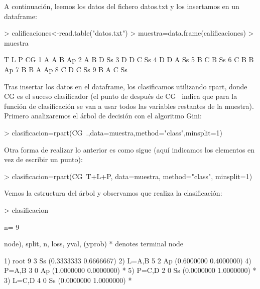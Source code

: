 \documentclass [a4paper] {article}
\begin{document}
A continuación, leemos los datos del fichero datos.txt y los insertamos en un dataframe:

\begin{Schunk}
\begin{Sinput}
> calificaciones<-read.table("datos.txt")
> muestra=data.frame(calificaciones)
> muestra
\end{Sinput}
\begin{Soutput}
  T L P CG
1 A A B Ap
2 A B D Ss
3 D D C Ss
4 D D A Ss
5 B C B Ss
6 C B B Ap
7 B B A Ap
8 C D C Ss
9 B A C Ss
\end{Soutput}
\end{Schunk}

Tras insertar los datos en el dataframe, los clasificamos utilizando rpart, donde CG es el suceso
clasificador (el punto de después de CG~ indica que para la función de clasificación se van a usar todos
las variables restantes de la muestra). Primero analizaremos el árbol de decisión con el algoritmo Gini:


\begin{Schunk}
\begin{Sinput}
> clasificacion=rpart(CG~.,data=muestra,method="class",minsplit=1)
\end{Sinput}
\end{Schunk}


Otra forma de realizar lo anterior es como sigue (aquí indicamos los elementos en vez de escribir un punto):

\begin{Schunk}
\begin{Sinput}
> clasificacion=rpart(CG~T+L+P, data=muestra, method="class", minsplit=1)
\end{Sinput}
\end{Schunk}

Vemos la estructura del árbol y observamos que realiza la clasificación:

\begin{Schunk}
\begin{Sinput}
> clasificacion
\end{Sinput}
\begin{Soutput}
n= 9 

node), split, n, loss, yval, (yprob)
      * denotes terminal node

1) root 9 3 Ss (0.3333333 0.6666667)  
  2) L=A,B 5 2 Ap (0.6000000 0.4000000)  
    4) P=A,B 3 0 Ap (1.0000000 0.0000000) *
    5) P=C,D 2 0 Ss (0.0000000 1.0000000) *
  3) L=C,D 4 0 Ss (0.0000000 1.0000000) *
\end{Soutput}
\end{Schunk}
\end{document}
